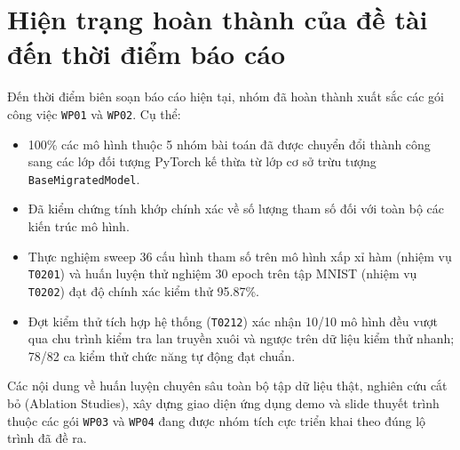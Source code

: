 \section{Hiện trạng hoàn thành của đề tài đến thời điểm báo cáo}
Đến thời điểm biên soạn báo cáo hiện tại, nhóm đã hoàn thành xuất sắc các gói công việc \texttt{WP01} và \texttt{WP02}. Cụ thể:
\begin{itemize}
\item 100\% các mô hình thuộc 5 nhóm bài toán đã được chuyển đổi thành công sang các lớp đối tượng PyTorch kế thừa từ lớp cơ sở trừu tượng \texttt{BaseMigratedModel}.
\item Đã kiểm chứng tính khớp chính xác về số lượng tham số đối với toàn bộ các kiến trúc mô hình.
\item Thực nghiệm sweep 36 cấu hình tham số trên mô hình xấp xỉ hàm (nhiệm vụ \texttt{T0201}) và huấn luyện thử nghiệm 30 epoch trên tập MNIST (nhiệm vụ \texttt{T0202}) đạt độ chính xác kiểm thử 95.87\%.
\item Đợt kiểm thử tích hợp hệ thống (\texttt{T0212}) xác nhận 10/10 mô hình đều vượt qua chu trình kiểm tra lan truyền xuôi và ngược trên dữ liệu kiểm thử nhanh; 78/82 ca kiểm thử chức năng tự động đạt chuẩn.
\end{itemize}
Các nội dung về huấn luyện chuyên sâu toàn bộ tập dữ liệu thật, nghiên cứu cắt bỏ (Ablation Studies), xây dựng giao diện ứng dụng demo và slide thuyết trình thuộc các gói \texttt{WP03} và \texttt{WP04} đang được nhóm tích cực triển khai theo đúng lộ trình đã đề ra.
